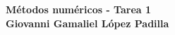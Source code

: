 \begin{center}
	\textbf{
		\textcolor{title}{Métodos numéricos - Tarea 1\\
			Giovanni Gamaliel López Padilla}}
\end{center}
